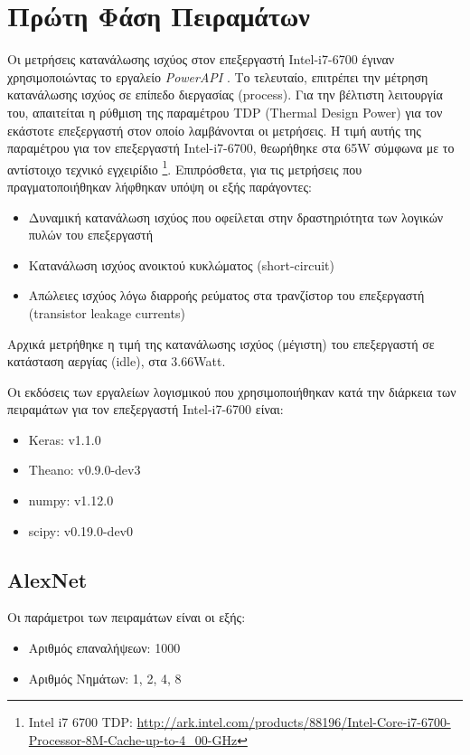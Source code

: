 \section{Πρώτη Φάση Πειραμάτων}
\label{sec:experiments_phase1}

Οι μετρήσεις κατανάλωσης ισχύος στον επεξεργαστή Intel-i7-6700 έγιναν
χρησιμοποιώντας το εργαλείο \emph{PowerAPI} \cite{grant2016standardizing}.
Το τελευταίο, επιτρέπει την μέτρηση κατανάλωσης ισχύος σε
επίπεδο διεργασίας (process). Για την βέλτιστη λειτουργία του,
απαιτείται η ρύθμιση της παραμέτρου TDP (Thermal Design Power) για τον εκάστοτε
επεξεργαστή στον οποίο λαμβάνονται οι μετρήσεις. Η τιμή αυτής της παραμέτρου για τον επεξεργαστή
Intel-i7-6700, θεωρήθηκε στα 65W σύμφωνα με το αντίστοιχο τεχνικό εγχειρίδιο
\footnote{Intel i7 6700 TDP: \url{http://ark.intel.com/products/88196/Intel-Core-i7-6700-Processor-8M-Cache-up-to-4_00-GHz}}.
Επιπρόσθετα, για τις μετρήσεις που πραγματοποιήθηκαν λήφθηκαν υπόψη οι εξής παράγοντες:
\begin{itemize}
  \item{Δυναμική κατανάλωση ισχύος που οφείλεται στην δραστηριότητα των λογικών πυλών του επεξεργαστή}
  \item{Κατανάλωση ισχύος ανοικτού κυκλώματος (short-circuit)}
  \item{Απώλειες ισχύος λόγω διαρροής ρεύματος στα τρανζίστορ του επεξεργαστή (transistor leakage currents)}
\end{itemize}

Αρχικά μετρήθηκε η τιμή της κατανάλωσης ισχύος (μέγιστη) του επεξεργαστή σε
κατάσταση αεργίας (idle), στα $3.66$Watt.

Οι εκδόσεις των εργαλείων λογισμικού που χρησιμοποιήθηκαν
κατά την διάρκεια των πειραμάτων για τον επεξεργαστή Intel-i7-6700 είναι:
\begin{itemize}
  \item{Keras: v1.1.0}
  \item{Theano: v0.9.0-dev3}
  \item{numpy: v1.12.0}
  \item{scipy: v0.19.0-dev0}
\end{itemize}



\subsection{AlexNet}

Οι παράμετροι των πειραμάτων είναι οι εξής:
\begin{itemize}
  \item{Αριθμός επαναλήψεων: 1000}
  \item{Αριθμός Νημάτων: 1, 2, 4, 8}
\end{itemize}

